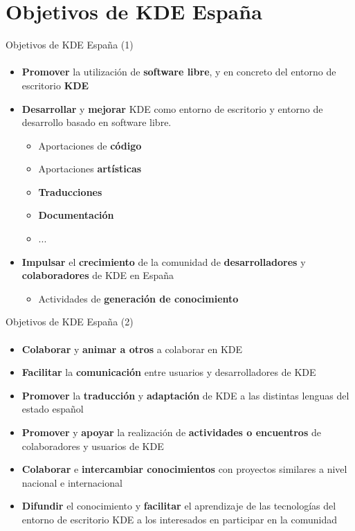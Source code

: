 \documentclass[12pt]{beamer}
\begin{document}
\section{Objetivos de KDE España}

\begin{frame}{Objetivos de KDE España (1)}
  \framesubtitle{}
  \begin{itemize}
    \item \textbf{Promover} la utilización de \textbf{software libre}, y en concreto del entorno de escritorio \textbf{KDE}
    \item \textbf{Desarrollar} y \textbf{mejorar} KDE como entorno de escritorio y entorno de desarrollo basado en software libre.
    \begin{itemize}
      \item Aportaciones de \textbf{código}
      \item Aportaciones \textbf{artísticas}
      \item \textbf{Traducciones}
      \item \textbf{Documentación}
      \item ...
    \end{itemize}
    \item \textbf{Impulsar} el \textbf{crecimiento} de la comunidad de \textbf{desarrolladores} y \textbf{colaboradores} de KDE en España
    \begin{itemize}
      \item Actividades de \textbf{generación de conocimiento}
    \end{itemize}
  \end{itemize}
\end{frame}

\begin{frame}{Objetivos de KDE España (2)}
  \framesubtitle{}
  \begin{itemize}
    \item \textbf{Colaborar} y \textbf{animar a otros} a colaborar en KDE
    \item \textbf{Facilitar} la \textbf{comunicación} entre usuarios y desarrolladores de KDE
    \item \textbf{Promover} la \textbf{traducción} y \textbf{adaptación} de KDE a las distintas lenguas del estado español
    \item \textbf{Promover} y \textbf{apoyar} la realización de \textbf{actividades o encuentros} de colaboradores y usuarios de KDE
    \item \textbf{Colaborar} e \textbf{intercambiar conocimientos} con proyectos similares a nivel nacional e internacional
    \item \textbf{Difundir} el conocimiento y \textbf{facilitar} el aprendizaje de las tecnologías del entorno de escritorio KDE a los interesados en participar en la comunidad
  \end{itemize}
\end{frame}
\end{document}
